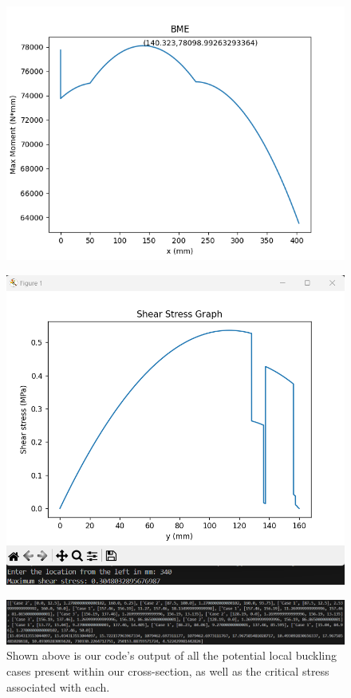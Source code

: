 \documentclass[11pt]{article}
\begin{document}
\begin{figure}[H]
    \centering
    \includegraphics[scale = 0.7]{images/BME Final.png}
\end{figure}

\begin{figure}[H]
    \centering
    \includegraphics[scale = 0.7]{images/Code F 3.png}
\end{figure}

\begin{figure}[H]
    \centering
    \includegraphics[scale = 0.5]{images/Code F 4.png}
    \caption*{Shown above is our code's output of all the potential local buckling cases present within our cross-section, as well as the critical stress associated with each.}
\end{figure}
\end{document}
